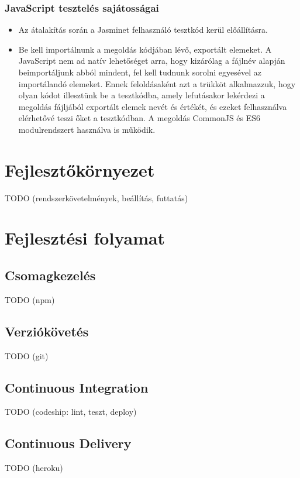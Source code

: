 \documentclass{elteikthesis}
\begin{document}
				\subsubsection{JavaScript tesztelés sajátosságai}
					\begin{itemize}
						\item Az átalakítás során a Jasminet felhasználó tesztkód kerül előállításra.
						\item Be kell importálnunk a megoldás kódjában lévő, exportált elemeket. A JavaScript nem ad natív lehetőséget arra, hogy kizárólag a fájlnév alapján beimportáljunk abból mindent, fel kell tudnunk sorolni egyesével az importálandó elemeket. Ennek feloldásaként azt a trükköt alkalmazzuk, hogy olyan kódot illesztünk be a tesztkódba, amely lefutásakor lekérdezi a megoldás fájljából exportált elemek nevét és értékét, és ezeket felhasználva elérhetővé teszi őket a tesztkódban. A megoldás CommonJS és ES6 modulrendszert használva is működik.
					\end{itemize}

		\section{Fejlesztőkörnyezet}
		TODO (rendszerkövetelmények, beállítás, futtatás)
		
		\section{Fejlesztési folyamat}

			\subsection{Csomagkezelés}
			TODO (npm)
			
			\subsection{Verziókövetés}
			TODO (git)
			
			\subsection{Continuous Integration}
			TODO (codeship: lint, teszt, deploy)
			
			\subsection{Continuous Delivery}
			TODO (heroku)
		
\end{document}
